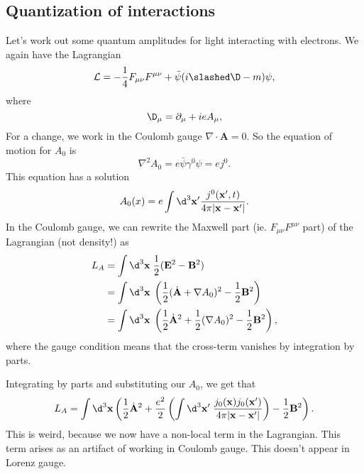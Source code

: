 \documentclass[a4paper]{article}
\begin{document}
\subsection{Quantization of interactions}
Let's work out some quantum amplitudes for light interacting with electrons. We again have the Lagrangian
\[
  \mathcal{L} = -\frac{1}{4} F_{\mu\nu}F^{\mu\nu} + \bar\psi (i \slashed \D - m)\psi,
\]
where
\[
  \D_\mu = \partial_\mu + i e A_\mu,
\]
For a change, we work in the Coulomb gauge $\nabla \cdot \mathbf{A} = 0$. So the equation of motion for $A_0$ is
\[
  \nabla^2 A_0 = e \bar\psi \gamma^0 \psi = ej^0.
\]
This equation has a solution
\[
  A_0(x) = e \int \d^3 \mathbf{x}' \frac{j^0(\mathbf{x}', t)}{4\pi |\mathbf{x} - \mathbf{x}'|}.
\]
In the Coulomb gauge, we can rewrite the Maxwell part (ie. $F_{\mu\nu}F^{\mu\nu}$ part) of the Lagrangian (not density!) as
\begin{align*}
  L_A &= \int \d^3 \mathbf{x}\; \frac{1}{2}(\mathbf{E}^2 - \mathbf{B}^2)\\
  &= \int \d^3 \mathbf{x}\; \left(\frac{1}{2} (\dot{\mathbf{A}} + \nabla A_0)^2 - \frac{1}{2} \mathbf{B}^2\right)\\
  &= \int \d^3 \mathbf{x}\; \left(\frac{1}{2}\dot{\mathbf{A}}^2 + \frac{1}{2}(\nabla A_0)^2 - \frac{1}{2}\mathbf{B}^2\right),
\end{align*}
where the gauge condition means that the cross-term vanishes by integration by parts.

Integrating by parts and substituting our $A_0$, we get that
\[
  L_A = \int \d^3 \mathbf{x} \left(\frac{1}{2} \dot{\mathbf{A}}^2 + \frac{e^2}{2} \left(\int \d^3 \mathbf{x}'\; \frac{j_0(\mathbf{x}) j_0(\mathbf{x}')}{4\pi|\mathbf{x} - \mathbf{x}'|}\right) - \frac{1}{2}\mathbf{B}^2\right).
\]
This is weird, because we now have a non-local term in the Lagrangian. This term arises as an artifact of working in Coulomb gauge. This doesn't appear in Lorenz gauge.
\end{document}
